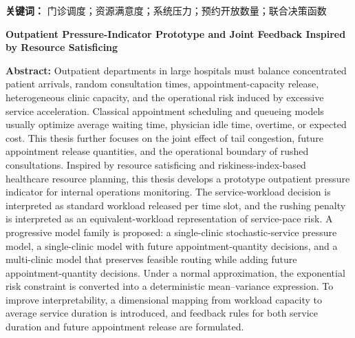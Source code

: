 \documentclass[a4paper,zihao=-4]{ctexart}
\numberwithin{figure}{section}
\numberwithin{table}{section}
\begin{document}
\textbf{关键词：} 门诊调度；资源满意度；系统压力；预约开放数量；联合决策函数

\clearpage

{}
\begin{center}
{\bfseries Outpatient Pressure-Indicator Prototype and Joint Feedback Inspired by Resource Satisficing}
\end{center}

\noindent\textbf{Abstract:}
Outpatient departments in large hospitals must balance concentrated patient arrivals, random consultation times, appointment-capacity release, heterogeneous clinic capacity, and the operational risk induced by excessive service acceleration. Classical appointment scheduling and queueing models usually optimize average waiting time, physician idle time, overtime, or expected cost. This thesis further focuses on the joint effect of tail congestion, future appointment release quantities, and the operational boundary of rushed consultations. Inspired by resource satisficing and riskiness-index-based healthcare resource planning, this thesis develops a prototype outpatient pressure indicator for internal operations monitoring. The service-workload decision is interpreted as standard workload released per time slot, and the rushing penalty is interpreted as an equivalent-workload representation of service-pace risk. A progressive model family is proposed: a single-clinic stochastic-service pressure model, a single-clinic model with future appointment-quantity decisions, and a multi-clinic model that preserves feasible routing while adding future appointment-quantity decisions. Under a normal approximation, the exponential risk constraint is converted into a deterministic mean--variance expression. To improve interpretability, a dimensional mapping from workload capacity to average service duration is introduced, and feedback rules for both service duration and future appointment release are formulated.
\end{document}
